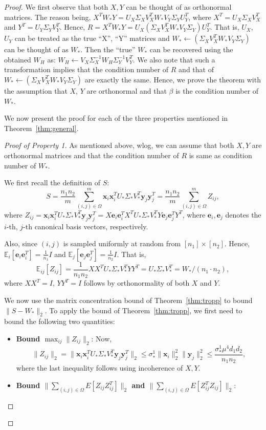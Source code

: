 \documentclass[11pt]{article}
\newcommand{\e}{\bm{e}}
\newcommand{\tp}[1]{{#1}^{T}}
\newcommand{\E}{\mathbb{E}}
\newcommand{\Vot}{\tp{V}_*}
\newcommand{\So}{\Sigma_*}
\newcommand{\Uo}{U_*}
\newcommand{\so}{\sigma_*}
\newcommand{\xti}{\tp{\x}_i}
\newcommand{\ytj}{\tp{\y}_j}
\newcommand{\Wo}{W_*}
\newcommand{\x}{\bm{x}}
\newcommand{\y}{\bm{y}}
\newcommand{\eit}{\tp{\e}_i}
\newcommand{\ejt}{\tp{\e}_j}
\begin{document}
\begin{proof}

We first observe that both $X, Y$ can be thought of as orthonormal matrices. The reason being, $X^T\Wo Y =U_X \Sigma_X V_X^T \Wo V_Y \Sigma_Y U_Y^T$, where $X^T=U_X \Sigma_X V_X^T$ and $Y^T=U_Y \Sigma_Y V_Y^T$. Hence, $R=X^T \Wo Y=U_X (\Sigma_X V_X^T \Wo V_Y \Sigma_Y) U_Y^T$. That is, $U_X $, $U_Y$ can be treated as the true ``X'', ``Y'' matrices and $\Wo\leftarrow (\Sigma_X V_X^T \Wo V_Y \Sigma_Y)$ can be thought of as $\Wo$.  Then the ``true'' $\Wo$ can be recovered using the obtained $W_H$ as: $W_H\leftarrow V_X \Sigma_X^{-1} W_H \Sigma_Y^{-1} V_Y^T$. We also note that such a transformation implies that the condition number of $R$ and that of $\Wo\leftarrow (\Sigma_X V_X^T \Wo V_Y \Sigma_Y)$ are exactly the same. Hence, we prove the theorem with the assumption that $X$, $Y$ are orthonormal and that $\beta$ is the condition number of $\Wo$. 

We now present the proof for each of the three properties mentioned in Theorem~\ref{thm:general}. 
\begin{proof}[Proof of Property 1]
As mentioned above, wlog, we can assume that  both $X, Y$ are orthonormal matrices and  that the condition number of $R$ is same as condition number of $\Wo$. 

We first recall the definition of $S$:
$$S=\frac{n_1n_2}{m}\sum_{(i,j)\in \Omega}^m \x_i\xti \Uo\So\Vot \y_j\ytj=\frac{n_1n_2}{m}\sum_{(i,j)\in \Omega}^m Z_{ij},$$
where $Z_{ij}=\x_i\xti \Uo\So\Vot \y_j\ytj = X \e_i \eit X^T \Uo\So\Vot Y \e_j \ejt Y^T$, where $\e_i, \e_j$ denotes the $i$-th, $j$-th canonical basis vectors, respectively. 

Also, since $(i,j)$ is sampled uniformly at random from $[n_1]\times [n_2]$. Hence, $\E_{i}[\e_i\eit]=\frac{1}{n_1}I$ and $\E_{j}[\e_j\ejt]=\frac{1}{n_2}I$. That is, 
$$\E_{ij}[Z_{ij}]=\frac{1}{n_1n_2} XX^T\Uo\So\Vot YY^T=\Uo\So\Vot=\Wo/(n_1\cdot n_2),$$ where $XX^T=I$, $YY^T=I$ follows by orthonormality of both $X$ and $Y$. 

We now use the matrix concentration bound of Theorem~\ref{thm:tropp} to bound $\|S-\Wo\|_2$. To apply the bound of Theorem~\ref{thm:tropp}, we first need to bound the following two quantities: 
\begin{itemize}
\item {\bf Bound $\max_{ij} \|Z_{ij}\|_2$}: Now, $$\|Z_{ij}\|_2=\|\x_i\xti \Uo\So\Vot \y_j\ytj\|_2\leq \so^1 \|\x_i\|_2^2 \|\y_j\|_2^2\leq \frac{\so^1\mu^4d_1d_2}{n_1n_2},$$
where the last inequality follows using incoherence of $X, Y$. 
\item {\bf Bound $\|\sum_{(i,j)\in \Omega}E[Z_{ij}Z_{ij}^T]\|_2$ and  $\|\sum_{(i,j)\in \Omega}E[Z_{ij}^TZ_{ij}]\|_2$}: 


\end{itemize}
\end{proof}
\end{proof}
\end{document}
